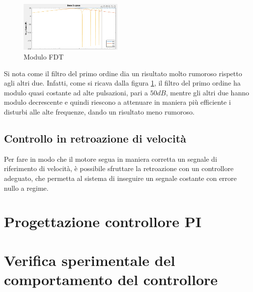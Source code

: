 \documentclass[a4paper, 12pt, Arial]{article}
\begin{document}
\begin{figure}
  \begin{center}
    \includegraphics[width=0.45\textwidth]{./Images/speed_filter_responses.png}
  \end{center}
  \caption{Modulo FDT}
  \label{Lab5:mags}
\end{figure}

Si nota come il filtro del primo ordine dia un risultato molto rumoroso rispetto agli altri due. Infatti, come si ricava dalla figura \ref{Lab5:mags}, il filtro del primo ordine ha modulo quasi costante ad alte pulsazioni, pari a $50 dB$, mentre gli altri due hanno modulo decrescente e quindi riescono a attenuare in maniera più efficiente i disturbi alle alte frequenze, dando un risultato meno rumoroso.

\subsection{Controllo in retroazione di velocità}
Per fare in modo che il motore segua in maniera corretta un segnale di riferimento di velocità, è possibile sfruttare la retroazione con un controllore adeguato, che permetta al sistema di inseguire un segnale costante con errore nullo a regime.

\section{Progettazione controllore PI}
\subsection{}
\section{Verifica sperimentale del comportamento del controllore}
\subsection{}
\end{document}
